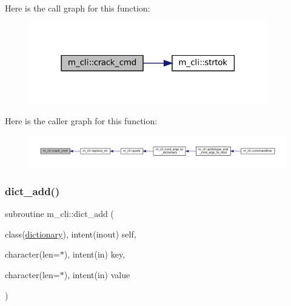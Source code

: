 Here is the call graph for this function\+:
\nopagebreak
\begin{figure}[H]
\begin{center}
\leavevmode
\includegraphics[width=294pt]{namespacem__cli_a8d5d1954aac6494e07fb11f12f635c85_cgraph}
\end{center}
\end{figure}
Here is the caller graph for this function\+:
\nopagebreak
\begin{figure}[H]
\begin{center}
\leavevmode
\includegraphics[width=350pt]{namespacem__cli_a8d5d1954aac6494e07fb11f12f635c85_icgraph}
\end{center}
\end{figure}
\mbox{\label{namespacem__cli_a1be098e2b920e8d50ed14be03a3133db}} 
\subsubsection{\texorpdfstring{dict\+\_\+add()}{dict\_add()}}
{\footnotesize\ttfamily subroutine m\+\_\+cli\+::dict\+\_\+add (\begin{DoxyParamCaption}\item[{class(\mbox{\hyperlink{structm__cli_1_1dictionary}{dictionary}}), intent(inout)}]{self,  }\item[{character(len=$\ast$), intent(in)}]{key,  }\item[{character(len=$\ast$), intent(in)}]{value }\end{DoxyParamCaption})\hspace{0.3cm}{\ttfamily [private]}}

\mbox{\label{namespacem__cli_aff32e44070983c7fb4eb0a3b1dea7a6d}} 
